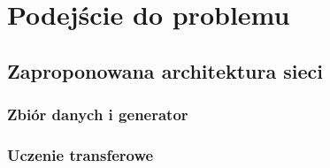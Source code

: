 \chapter{Podejście do problemu}





\section{Zaproponowana architektura sieci}

\subsection{Zbiór danych i generator}

\subsection{Uczenie transferowe}
